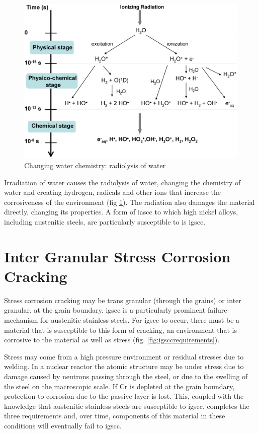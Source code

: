 \begin{figure}
  \begin{center}
    \includegraphics[width=.5\linewidth]{chapters/austenitic_steels_in_nuclear/images/water_radiolysis.png}
    \caption{Changing water chemistry: radiolysis of water\cite{waterradiolysis}}
    \label{fig:radiolysisofwater}
  \end{center}
\end{figure}

Irradiation of water causes the radiolysis of water, changing the chemistry of water and creating hydrogen, radicals and other ions that increase the corrosiveness of the environment (fig \ref{fig:radiolysisofwater}).  The radiation also damages the material directly, changing its properties.  A form of \acrshort{iascc} to which high nickel alloys, including austenitic steels, are particularly susceptible to is \acrlong{igscc}.


\FloatBarrier

\section[IGSCC]{Inter Granular Stress Corrosion Cracking}

Stress corrosion cracking may be trans granular (through the grains) or inter granular, at the grain boundary.  \acrshort{igscc} is a particularly prominent failure mechanism for austenitic stainless steels.  For \acrshort{igscc} to occur, there must be a material that is susceptible to this form of cracking, an environment that is corrosive to the material as well as stress (fig. \ref{fig:igsccrequirements}).  

Stress may come from a high pressure environment or residual stresses due to welding.  In a nuclear reactor the atomic structure may be under stress due to damage caused by neutrons passing through the steel, or due to the swelling of the steel on the macroscopic scale.  If Cr is depleted at the grain boundary, protection to corrosion due to the passive layer is lost.  This, coupled with the knowledge that austenitic stainless steels are susceptible to \acrshort{igscc}, completes the three requirements and, over time, components of this material in these conditions will eventually fail to \acrshort{igscc}.

